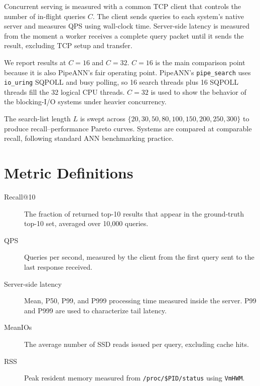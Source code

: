 Concurrent serving is measured with a common TCP client that controls the number of in-flight queries $C$.
The client sends queries to each system's native server and measures QPS using wall-clock time.
Server-side latency is measured from the moment a worker receives a complete query packet until it sends the result, excluding TCP setup and transfer.

We report results at $C=16$ and $C=32$.
$C=16$ is the main comparison point because it is also PipeANN's fair operating point.
PipeANN's \texttt{pipe\_search} uses \texttt{io\_uring} SQPOLL and busy polling, so 16 search threads plus 16 SQPOLL threads fill the 32 logical CPU threads.
$C=32$ is used to show the behavior of the blocking-I/O systems under heavier concurrency.

The search-list length $L$ is swept across $\{20, 30, 50, 80, 100, 150, 200, 250, 300\}$ to produce recall--performance Pareto curves.
Systems are compared at comparable recall, following standard ANN benchmarking practice\cite{aumuller2020annbench}.

\section{Metric Definitions}
\label{sec:metrics}

\begin{description}
  \item[Recall@10]
    The fraction of returned top-10 results that appear in the ground-truth top-10 set, averaged over 10,000 queries.

  \item[QPS]
    Queries per second, measured by the client from the first query sent to the last response received.

  \item[Server-side latency]
    Mean, P50, P99, and P999 processing time measured inside the server. P99 and P999 are used to characterize tail latency.

  \item[MeanIOs]
    The average number of SSD reads issued per query, excluding cache hits.

  \item[RSS]
    Peak resident memory measured from \texttt{/proc/\$PID/status} using \texttt{VmHWM}.
\end{description}

